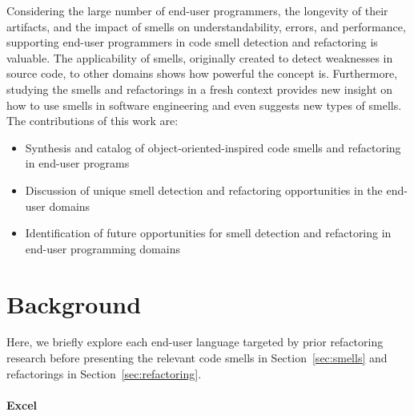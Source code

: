 \documentclass[10pt,conference,compsocconf]{IEEEtran}
\begin{document}
Considering the large number of end-user programmers, the longevity of their artifacts, and the impact of smells on understandability, errors, and performance, supporting end-user programmers in code smell detection and refactoring is valuable.
The applicability of smells, originally created to detect weaknesses in source code, to other domains shows how powerful the concept is. Furthermore, studying the smells and refactorings in a fresh context provides new insight on how to use smells in software engineering and  even suggests new types of smells.
The contributions of this work are:

\begin{itemize}
	\item Synthesis and catalog of object-oriented-inspired code smells  and refactoring in end-user programs
	\item Discussion of unique smell detection and refactoring opportunities in the end-user domains %
	\item Identification of future opportunities for smell detection and refactoring in end-user programming domains
\end{itemize}


\section{Background}
\label{sec:background}

Here, we briefly explore each end-user language targeted by prior refactoring research  before presenting the relevant code smells in  Section~\ref{sec:smells} and refactorings in Section~\ref{sec:refactoring}.

\paragraph{Excel}
\end{document}
